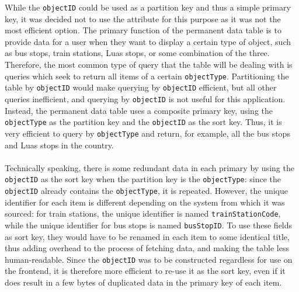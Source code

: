 \documentclass[a4paper,11pt]{report}
\begin{document}
While the \verb|objectID| could be used as a partition key and thus a simple primary key, it was decided not to use the attribute for this purpose as it was not the most efficient option.
The primary function of the permanent data table is to provide data for a user when they want to display a certain type of object, such as bus stops, train stations, Luas stops, or some combination of the three.
Therefore, the most common type of query that the table will be dealing with is queries which seek to return all items of a certain \verb|objectType|.
Partitioning the table by \verb|objectID| would make querying by \verb|objectID| efficient, but all other queries inefficient, and querying by \verb|objectID| is not useful for this application.
Instead, the permanent data table uses a composite primary key, using the \verb|objectType| as the partition key and the \verb|objectID| as the sort key.
Thus, it is very efficient to query by \verb|objectType| and return, for example, all the bus stops and Luas stops in the country.
\\\\
Technically speaking, there is some redundant data in each primary by using the \verb|objectID| as the sort key when the partition key is the \verb|objectType|: since the \verb|objectID| already contains the \verb|objectType|, it is repeated.
However, the unique identifier for each item is different depending on the system from which it was sourced:
for train stations, the unique identifier is named \verb|trainStationCode|, while the unique identifier for bus stops is named \verb|busStopID|.
To use these fields as sort key, they would have to be renamed in each item to some identical title, thus adding overhead to the process of fetching data, and making the table less human-readable.
Since the \verb|objectID| was to be constructed regardless for use on the frontend, it is therefore more efficient to re-use it as the sort key, even if it does result in a few bytes of duplicated data in the primary key of each item.
\end{document}
